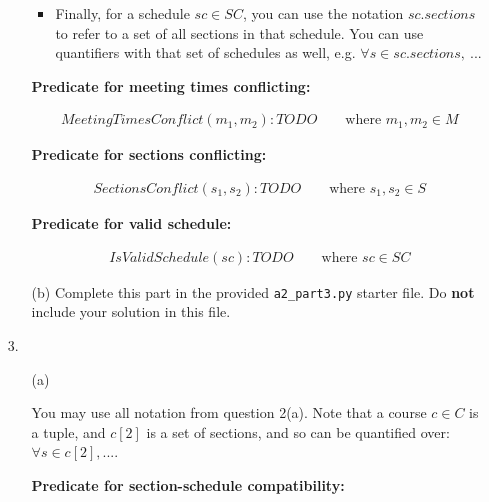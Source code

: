 \documentclass[fontsize=11pt]{article}
\begin{document}
\begin{enumerate}
\begin{enumerate}
\begin{itemize}
\item
Finally, for a schedule $sc \in SC$, you can use the notation $sc.sections$ to refer to a set of all sections in that schedule.
You can use quantifiers with that set of schedules as well, e.g.
$\forall s \in sc.sections,~ ...$
\end{itemize}

\textbf{Predicate for meeting times conflicting:}

\begin{align*}
MeetingTimesConflict(m_1, m_2) : TODO
\qquad \text{where $m_1, m_2 \in M$}
\end{align*}

\smallskip

\textbf{Predicate for sections conflicting:}

\begin{align*}
SectionsConflict(s_1, s_2) : TODO
\qquad \text{where $s_1, s_2 \in S$}
\end{align*}

\smallskip

\textbf{Predicate for valid schedule:}

\begin{align*}
IsValidSchedule(sc) : TODO
\qquad \text{where $sc \in SC$}
\end{align*}


\item[(b)]
Complete this part in the provided \texttt{a2\_part3.py} starter file.
Do \textbf{not} include your solution in this file.
\end{enumerate}

\item[3.]

\begin{enumerate}
\item[(a)]

You may use all notation from question 2(a).
Note that a course $c \in C$ is a tuple, and $c[2]$ is a set of sections, and so can be quantified over: $\forall s \in c[2], ...$.

\smallskip

\textbf{Predicate for section-schedule compatibility:}


\end{enumerate}
\end{enumerate}
\end{document}
